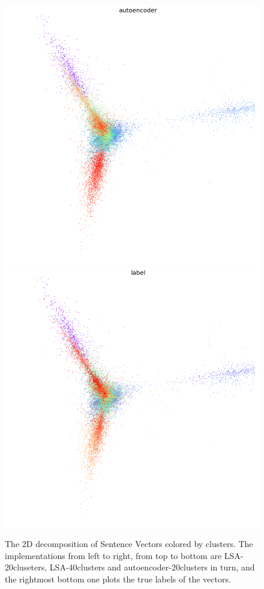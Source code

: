 \documentclass[12pt]{article}
\begin{document}
\begin{figure}
  \includegraphics[width=\ww\linewidth]{autoencoder.png}
  \includegraphics[width=\ww\linewidth]{label.png}
  \caption{The 2D decomposition of Sentence Vectors
  colored by clusters. The implementations from left
  to right, from top to bottom are LSA-20cluseters,
  LSA-40clusters and autoencoder-20clusters in turn,
  and the rightmost bottom one plots the true labels
  of the vectors.}
  \label{2dplot}
\end{figure}
\end{document}
